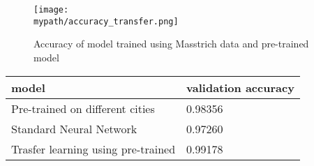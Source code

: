 \documentclass[a4paper]{article}
\begin{document}
	\begin{figure}[h!]
		\centerline{\texttt{[image: \\mypath/accuracy\_transfer.png]}}
		\caption{Accuracy of model trained using Masstrich data and pre-trained model}
	\end{figure}

	
	
	\begin{table}[!h]
		\begin{tabular}{|l|l|}
			\hline
			model &  validation accuracy  \\ \hline
			Pre-trained on different cities  & 0.98356 \\ \hline
			Standard Neural Network & 0.97260 \\ \hline
			Trasfer learning using pre-trained &  0.99178 \\ \hline
		\end{tabular}
	\end{table} 
\end{document}
